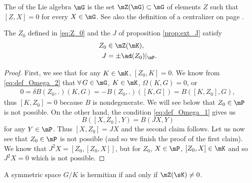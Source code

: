 \begin{definition}
	The  of the Lie algebra $\mG$ is the set $\mZ(\mG)\subset\mG$ of elements $Z$ such that $[Z,X]=0$ for every $X\in\mG$. See also the definition of a centralizer on page \pageref{PgDefCentralisateur}.
\end{definition}

\begin{proposition}
The $Z_0$ defined in \eqref{eq:Z_0} and the $J$ of proposition \ref{prop:ext_J} satisfy
\begin{subequations}
\begin{align}
   Z_0&\in\mZ(\mK),\\
   J&=\pm\ad(Z_0)|_{\mP}.
\end{align}   
\end{subequations}


\end{proposition}

\begin{proof}
First, we see that for any $K\in\mK$, $[Z_0,K]=0$. We know from \eqref{eq:def_Omega_2} that $\forall\,G\in\mG$, $K\in\mK$, $\Omega(K,G)=0$, or
\begin{equation}
\begin{split}
  0=\delta B(Z_0,.)(K,G)=-B(Z_0,.)([K,G])
                       =B([K,Z_0],G),
\end{split}
\end{equation}
thus $[K,Z_0]=0$ because $B$ is nondegenerate. We will see below that $Z_0\in\mP$ is not possible.  On the other hand, the condition \eqref{eq:def_Omega_1} gives us
\[
  B( [X,Z_0],Y )=B(JX,Y)
\]
for any $Y\in\mP$. Thus $[X,Z_0]=JX$ and the second claim follows. Let us now see that $Z_0\in\mP$ is not possible (and so we finish the proof of the first claim). We know that $J^2X=[Z_0,[Z_0,X]]$, but for $Z_0$, $X\in\mP$, $[Z_0,X]\in\mK$ and so $J^2X=0$ which is not possible.

\end{proof}


\begin{lemma}
A symmetric space $G/K$ is hermitian if and only if $\mZ(\sK)\neq 0$.
\end{lemma}

